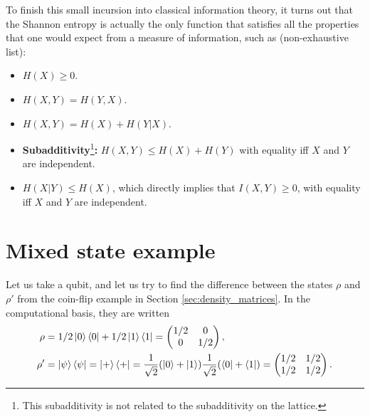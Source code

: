 To finish this small incursion into classical information theory, it turns out that the Shannon entropy is actually the only function that satisfies all the properties that one would expect from a measure of information, such as (non-exhaustive list):

\begin{itemize}
    \item $H(X) \geq 0$.
    \item $H(X, Y) = H(Y, X)$.
    \item $H(X, Y) = H(X) + H(Y|X)$.
    \item \textbf{Subadditivity}\footnote{This subadditivity is not related to the subadditivity on the lattice.}\textbf{:} $H(X, Y) \leq H(X) + H(Y)$ with equality iff $X$ and $Y$ are independent.
    \item $H(X|Y) \leq H(X)$, which directly implies that $I(X, Y) \geq 0$, with equality iff $X$ and $Y$ are independent.
\end{itemize}



\newpage

\section{Mixed state example}
\label{app:mixed_example}

\setcounter{equation}{0}

Let us take a qubit, and let us try to find the difference between the states $\rho$ and $\rho'$ from the coin-flip example in Section \ref{sec:density_matrices}. In the computational basis, they are written
\begin{align}
    \rho &= 1/2 \ket{0}\bra{0} + 1/2 \ket{1}\bra{1} = \left(\begin{matrix}
        1/2 & 0\\
        0 & 1/2
    \end{matrix}\right),\\
    \rho' &= \ket{\psi}\bra{\psi} = \ket{+}\bra{+} = \frac{1}{\sqrt{2}}(\ket{0} + \ket{1})\frac{1}{\sqrt{2}}(\bra{0} + \bra{1}) = \left(\begin{matrix}
        1/2 & 1/2\\
        1/2 & 1/2
    \end{matrix}\right).
\end{align}

